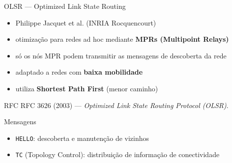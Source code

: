\documentclass[aspectratio=169,11pt]{beamer}
\begin{document}
\begin{frame}{OLSR --- Optimized Link State Routing}
  \begin{itemize}
    \item Philippe Jacquet et al. (INRIA Rocquencourt)
    \item otimização para redes ad hoc mediante \textbf{MPRs (Multipoint Relays)}
    \item só os nós MPR podem transmitir as mensagens de descoberta da rede
    \item adaptado a redes com \textbf{baixa mobilidade}
    \item utiliza \textbf{Shortest Path First} (menor caminho)
  \end{itemize}
  \begin{exampleblock}{RFC}
    RFC 3626 (2003) --- \emph{Optimized Link State Routing Protocol (OLSR)}.
  \end{exampleblock}
  \begin{block}{Mensagens}
    \begin{itemize}
      \item \texttt{HELLO}: descoberta e manutenção de vizinhos
      \item \texttt{TC} (Topology Control): distribuição de informação de conectividade
    \end{itemize}
  \end{block}
\end{frame}
\end{document}
